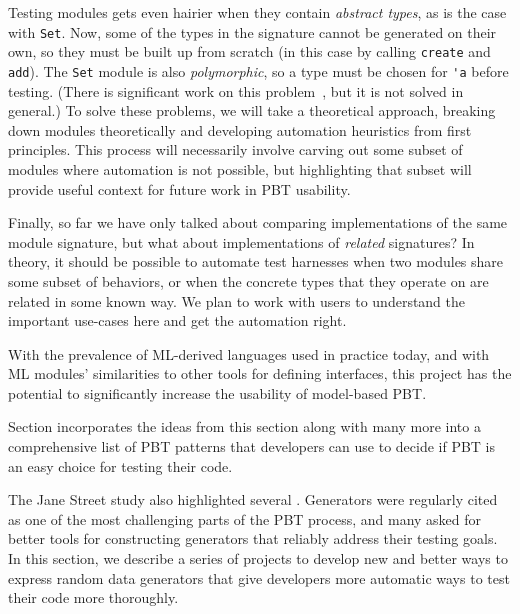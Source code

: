 Testing modules gets even hairier when they contain {\em abstract types}, as is
the case with \lstinline{Set}. Now, some of the types in the signature cannot be
generated on their own, so they must be built up from scratch (in this case by
calling \lstinline{create} and \lstinline{add}). The \lstinline{Set} module is
also {\em polymorphic}, so a type must be chosen for \lstinline{'a} before
testing. (There is significant work on this
problem~\cite{hou_favonia_logarithm_2022}, but it is not solved in general.)
To solve these problems, we will take a theoretical approach, breaking down
modules theoretically and developing automation heuristics from first
principles. This process will necessarily involve carving out some subset of
modules where automation is not possible, but highlighting that subset will
provide useful context for future work in PBT usability.

Finally, so far we have only talked about comparing implementations of the same
module signature, but what about implementations of {\em related} signatures? In
theory, it should be possible to automate test harnesses when two modules share
some subset of behaviors, or when the concrete types that they operate on are
related in some known way. We plan to work with users to understand the
important use-cases here and get the automation right.

With the prevalence of ML-derived languages used in practice today, and with ML
modules' similarities to other tools for defining interfaces, this project has
the potential to significantly increase the usability of model-based PBT.

Section  incorporates the ideas from this section along
with many more into a comprehensive list of PBT patterns that developers can use
to decide if PBT is an easy choice for testing their code.

%
The Jane Street study also highlighted several .
Generators were regularly cited
as one of the most challenging parts of the
PBT process, and many
asked for better tools for constructing generators that reliably address
their testing goals. In this section, we describe a series of projects
to develop new and better ways to express random data generators that give
developers more automatic ways to test their code more thoroughly.

